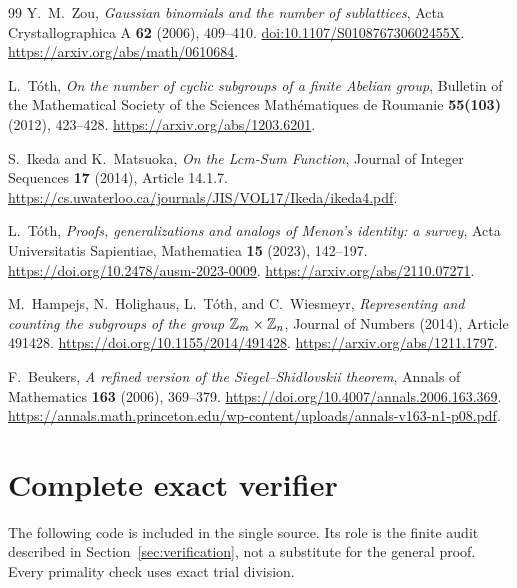\begin{thebibliography}{99}
Y.~M.~Zou, \emph{Gaussian binomials and the number of sublattices},
Acta Crystallographica A \textbf{62} (2006), 409--410.
\href{https://doi.org/10.1107/S010876730602455X}{doi:10.1107/S010876730602455X}.
\url{https://arxiv.org/abs/math/0610684}.

L.~T\'oth, \emph{On the number of cyclic subgroups of a finite Abelian group},
Bulletin of the Mathematical Society of the Sciences Math\'ematiques
de Roumanie \textbf{55(103)} (2012), 423--428.
\url{https://arxiv.org/abs/1203.6201}.

S.~Ikeda and K.~Matsuoka, \emph{On the Lcm-Sum Function},
Journal of Integer Sequences \textbf{17} (2014), Article 14.1.7.
\url{https://cs.uwaterloo.ca/journals/JIS/VOL17/Ikeda/ikeda4.pdf}.


L.~T\'oth, \emph{Proofs, generalizations and analogs of Menon's identity:
a survey}, Acta Universitatis Sapientiae, Mathematica
\textbf{15} (2023), 142--197.
\url{https://doi.org/10.2478/ausm-2023-0009}.
\url{https://arxiv.org/abs/2110.07271}.

M.~Hampejs, N.~Holighaus, L.~T\'oth, and C.~Wiesmeyr,
\emph{Representing and counting the subgroups of the group
$\mathbb Z_m\times\mathbb Z_n$}, Journal of Numbers (2014), Article 491428.
\url{https://doi.org/10.1155/2014/491428}.
\url{https://arxiv.org/abs/1211.1797}.

F.~Beukers, \emph{A refined version of the Siegel--Shidlovskii theorem},
Annals of Mathematics \textbf{163} (2006), 369--379.
\url{https://doi.org/10.4007/annals.2006.163.369}.
\url{https://annals.math.princeton.edu/wp-content/uploads/annals-v163-n1-p08.pdf}.

\end{thebibliography}

\clearpage
\appendix
\section{Complete exact verifier}
The following code is included in the single source. Its role is the
finite audit described in Section~\ref{sec:verification}, not a substitute for the general
proof. Every primality check uses exact trial division.



